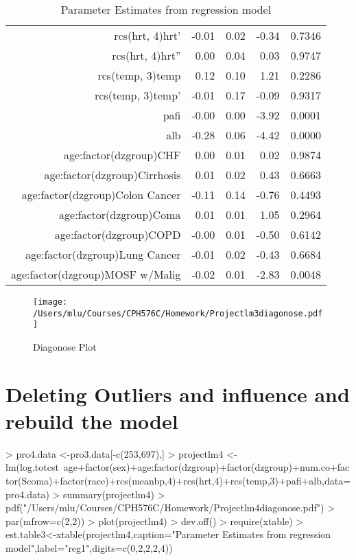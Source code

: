 \documentclass{article}
\begin{document}
\begin{Schunk}
\begin{table}[ht]
\begin{tabular}{rrrrr}
$$  rcs(hrt, 4)hrt' & -0.01 & 0.02 & -0.34 & 0.7346 \\ 
  rcs(hrt, 4)hrt'' & 0.00 & 0.04 & 0.03 & 0.9747 \\ 
  rcs(temp, 3)temp & 0.12 & 0.10 & 1.21 & 0.2286 \\ 
  rcs(temp, 3)temp' & -0.01 & 0.17 & -0.09 & 0.9317 \\ 
  pafi & -0.00 & 0.00 & -3.92 & 0.0001 \\ 
  alb & -0.28 & 0.06 & -4.42 & 0.0000 \\ 
  age:factor(dzgroup)CHF & 0.00 & 0.01 & 0.02 & 0.9874 \\ 
  age:factor(dzgroup)Cirrhosis & 0.01 & 0.02 & 0.43 & 0.6663 \\ 
  age:factor(dzgroup)Colon Cancer & -0.11 & 0.14 & -0.76 & 0.4493 \\ 
  age:factor(dzgroup)Coma & 0.01 & 0.01 & 1.05 & 0.2964 \\ 
  age:factor(dzgroup)COPD & -0.00 & 0.01 & -0.50 & 0.6142 \\ 
  age:factor(dzgroup)Lung Cancer & -0.01 & 0.02 & -0.43 & 0.6684 \\ 
  age:factor(dzgroup)MOSF w/Malig & -0.02 & 0.01 & -2.83 & 0.0048 \\ 
   \hline
\end{tabular}
\caption{Parameter Estimates from regression model} 
\label{reg2}
\end{table}\end{Schunk}
     
     \begin{figure}[htb]
     \begin{center}
     \texttt{[image: /Users/mlu/Courses/CPH576C/Homework/Projectlm3diagonose.pdf]}
     \caption{Diagonose Plot }
     \end{center}
     \end{figure}


       
      




         
\section{Deleting Outliers and influence and rebuild the model}
\begin{Schunk}
\begin{Sinput}
> pro4.data <-pro3.data[-c(253,697),]
> projectlm4 <- lm(log.totcst~age+factor(sex)+age:factor(dzgroup)+factor(dzgroup)+num.co+factor(Scoma)+factor(race)+rcs(meanbp,4)+rcs(hrt,4)+rcs(temp,3)+pafi+alb,data=pro4.data)
> summary(projectlm4)
> pdf("/Users/mlu/Courses/CPH576C/Homework/Projectlm4diagonose.pdf")
> par(mfrow=c(2,2))
> plot(projectlm4)
> dev.off()
> require(xtable)
> est.table3<-xtable(projectlm4,caption="Parameter Estimates from regression model",label="reg1",digits=c(0,2,2,2,4))
\end{Sinput}
\end{Schunk}
\end{document}
